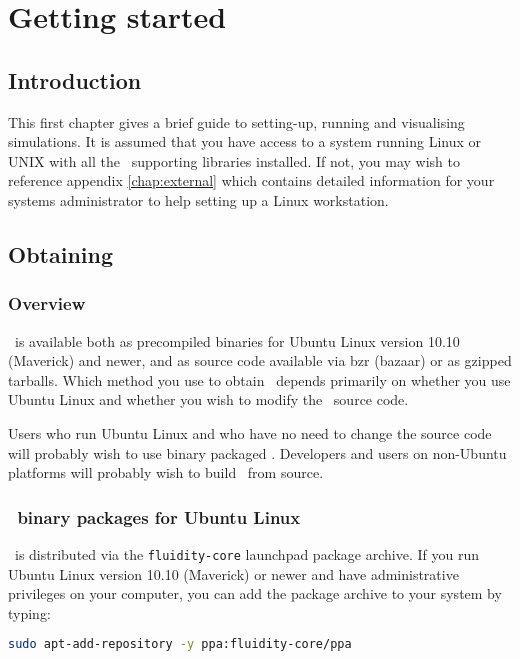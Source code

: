 \chapter{Getting started}\label{chap:gettingstarted}

\section{Introduction} This first chapter gives a brief guide to setting-up,
running and visualising simulations. It is assumed that you have access to a
system running Linux or UNIX with all the \fluidity\ supporting libraries
installed. If not, you may wish to reference appendix \ref{chap:external} which
contains detailed information for your systems administrator to help setting up
a Linux workstation. 

\section{Obtaining \fluidity}
\label{sec:obtaining_fluidity}

\subsection{Overview}
\label{sec:obtaining_fluidity_overview}

\fluidity\ is available both as precompiled binaries for Ubuntu Linux version
10.10 (Maverick) and newer, and as source code available via bzr (bazaar) or as
gzipped tarballs. Which method you use to obtain \fluidity\ depends primarily on
whether you use Ubuntu Linux and whether you wish to modify the \fluidity\
source code.

Users who run Ubuntu Linux and who have no need to change the source code will
probably wish to use binary packaged \fluidity. Developers and users on
non-Ubuntu platforms will probably wish to build \fluidity\ from source.

\subsection{\fluidity\ binary packages for Ubuntu Linux}

\fluidity\ is distributed via the \lstinline[language=Bash]+fluidity-core+
launchpad package archive. If you run Ubuntu Linux version 10.10 (Maverick) or
newer and have administrative privileges on your computer, you can add the
package archive to your system by typing:

\begin{lstlisting}[language=Bash]
sudo apt-add-repository -y ppa:fluidity-core/ppa
\end{lstlisting}

